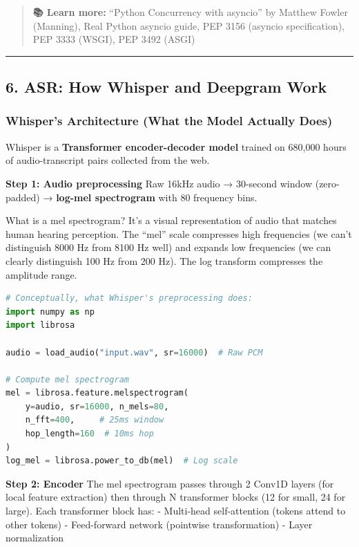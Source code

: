 \documentclass[
  11pt,
]{article}
\begin{document}
\begin{quote}
\textbf{📚 Learn more:} ``Python Concurrency with asyncio'' by Matthew
Fowler (Manning), Real Python asyncio guide, PEP 3156 (asyncio
specification), PEP 3333 (WSGI), PEP 3492 (ASGI)
\end{quote}

\begin{center}\rule{0.5\linewidth}{0.5pt}\end{center}

\hypertarget{asr-how-whisper-and-deepgram-work}{%
\subsection{6. ASR: How Whisper and Deepgram
Work}\label{asr-how-whisper-and-deepgram-work}}

\hypertarget{whispers-architecture-what-the-model-actually-does}{%
\subsubsection{Whisper's Architecture (What the Model Actually
Does)}\label{whispers-architecture-what-the-model-actually-does}}

Whisper is a \textbf{Transformer encoder-decoder model} trained on
680,000 hours of audio-transcript pairs collected from the web.

\textbf{Step 1: Audio preprocessing} Raw 16kHz audio → 30-second window
(zero-padded) → \textbf{log-mel spectrogram} with 80 frequency bins.

What is a mel spectrogram? It's a visual representation of audio that
matches human hearing perception. The ``mel'' scale compresses high
frequencies (we can't distinguish 8000 Hz from 8100 Hz well) and expands
low frequencies (we can clearly distinguish 100 Hz from 200 Hz). The log
transform compresses the amplitude range.

\begin{lstlisting}[language=Python]
# Conceptually, what Whisper's preprocessing does:
import numpy as np
import librosa

audio = load_audio("input.wav", sr=16000)  # Raw PCM

# Compute mel spectrogram
mel = librosa.feature.melspectrogram(
    y=audio, sr=16000, n_mels=80,
    n_fft=400,     # 25ms window
    hop_length=160  # 10ms hop
)
log_mel = librosa.power_to_db(mel)  # Log scale
\end{lstlisting}

\textbf{Step 2: Encoder} The mel spectrogram passes through 2 Conv1D
layers (for local feature extraction) then through N transformer blocks
(12 for small, 24 for large). Each transformer block has: - Multi-head
self-attention (tokens attend to other tokens) - Feed-forward network
(pointwise transformation) - Layer normalization
\end{document}
